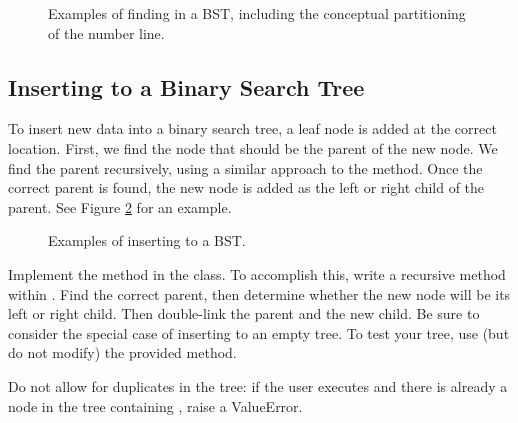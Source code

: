 \begin{figure}
\caption{Examples of finding in a BST, including the conceptual partitioning of the number line.}
\label{fig:BST.find}
\end{figure}

\subsection*{Inserting to a Binary Search Tree}

To insert new data into a binary search tree, a leaf node is added at the correct location.
First, we find the node that should be the parent of the new node.
We find the parent recursively, using a similar approach to the  method.
Once the correct parent is found, the new node is added as the left or right child of the parent.
See Figure \ref{fig:BST.insertion} for an example.

\begin{figure}
\caption{Examples of inserting to a BST.}
\label{fig:BST.insertion}
\end{figure}

\begin{problem}
Implement the  method in the  class.
To accomplish this, write a recursive  method within .
Find the correct parent, then determine whether the new node will be its left or right child.
Then double-link the parent and the new child.
Be sure to consider the special case of inserting to an empty tree.
To test your tree, use (but do not modify) the provided  method.

Do not allow for duplicates in the tree: if the user executes  and there is already a node in the tree containing , raise a ValueError.
\end{problem}

